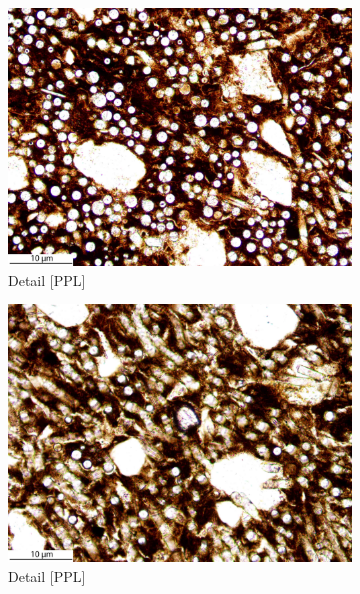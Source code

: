 \documentclass[a4paper]{article}
\begin{document}
\begin{figure}[H]
\begin{subfigure}[t]{.32\textwidth}
		\includegraphics[width=\textwidth]{ThinSections/53-2_20x_PPL.jpg}
		\caption{Detail [PPL]}
	\end{subfigure}\hspace{.1em}\hfill
	\begin{subfigure}[t]{.32\textwidth}
		\includegraphics[width=\textwidth]{ThinSections/53-3_20x_PPL.jpg}
		\caption{Detail [PPL]}
	\end{subfigure}\hspace{.1em}\hfill
	\begin{subfigure}[t]{.32\textwidth}

\end{subfigure}
\end{figure}
\end{document}
